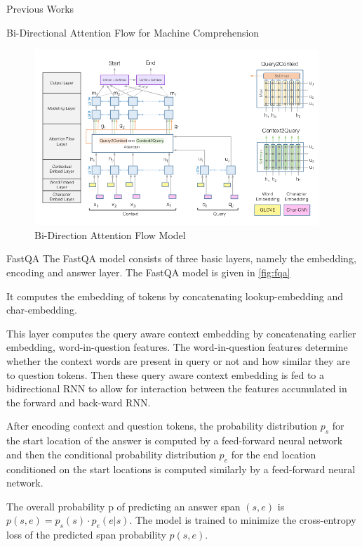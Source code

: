 \documentclass{article}
\begin{document}
\begin{psection}{Previous Works}
\begin{psubsection}{Bi-Directional Attention Flow for Machine Comprehension}
		\begin{figure}[ht!]
			\centering
			\includegraphics[height=250px]{includes/bidaf.png}
			\caption{Bi-Direction Attention Flow Model }
			\label{fig:bidaf}
		\end{figure}

	\end{psubsection}

	\begin{psubsection}{FastQA}
		The FastQA \citep{fastqa} model consists of three basic layers, namely the embedding, encoding and answer layer. The FastQA model is given in \ref{fig:fqa}

		\begin{enumerate}
			 It computes the embedding of tokens by concatenating lookup-embedding and char-embedding.

			 This layer computes the query aware context embedding by concatenating earlier embedding, word-in-question features.
				The word-in-question features determine whether the context words are present in query or not and how similar they are to question tokens.
				Then these query aware context embedding is fed to a bidirectional RNN to allow for interaction between the features accumulated in the forward and back-ward RNN.

			 After encoding context and question tokens, the probability distribution $p_s$ for the start location of the answer is computed by a feed-forward neural network and then the conditional probability distribution $p_e$ for the end location conditioned on the start locations is computed similarly by a feed-forward neural network.

				The overall probability p of predicting an answer span $(s, e)$ is $p(s, e) = p_s(s) \cdot p_e (e|s)$.
				The model is trained to minimize the cross-entropy loss of the predicted span probability $p(s, e)$.
		\end{enumerate}


\end{psubsection}
\end{psection}
\end{document}
